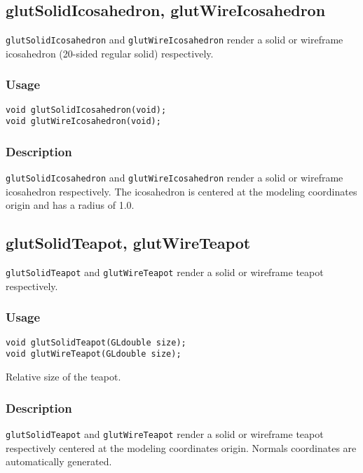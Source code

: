 \subsection{glutSolidIcosahedron, glutWireIcosahedron}

{\tt glutSolidIcosahedron} and {\tt glutWireIcosahedron} render a solid or wireframe
icosahedron (20-sided regular solid) respectively.

\subsubsection*{Usage}
\begin{verbatim}
void glutSolidIcosahedron(void);
void glutWireIcosahedron(void);
\end{verbatim}

\subsubsection*{Description}


{\tt glutSolidIcosahedron} and {\tt glutWireIcosahedron} render a solid or wireframe
icosahedron respectively.  The icosahedron is centered at the modeling coordinates origin and has a radius
of 1.0.

\subsection{glutSolidTeapot, glutWireTeapot}

{\tt glutSolidTeapot} and {\tt glutWireTeapot} render a solid or wireframe
teapot respectively.

\subsubsection*{Usage}
\begin{verbatim}
void glutSolidTeapot(GLdouble size);
void glutWireTeapot(GLdouble size);
\end{verbatim}
\begin{description}
\itemsep 0in
\item[\tt size] Relative size of the teapot.
\end{description}

\subsubsection*{Description}

{\tt glutSolidTeapot} and {\tt glutWireTeapot} render a solid or wireframe
teapot respectively centered at the modeling coordinates origin.  Normals
coordinates are automatically generated.

